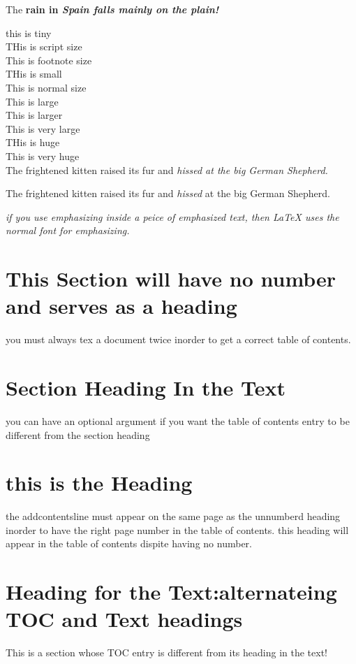 \documentclass[12pt,twoside,leqno]{article}%
\begin{document}
The \bf rain \rm in \it Spain \rm falls \sl mainly \rm on the \sf plain! \rm

\tiny this is tiny\\
\scriptsize THis is script size\\
\footnotesize This is footnote size\\
\small THis is small\\
\normalsize This is normal size\\
\large This is large\\
\Large This is larger\\
\LARGE This is very large\\
\huge THis is huge\\
\Huge This is very huge\normalsize\\


The \tiny frightened kitten \normalsize raised its fur and \it hissed \rm at the \Large big German Shepherd. \normalsize

The {\tiny frightened kitten} raised its fur and {\it hissed} at the {\Large big German Shepherd.}

\emph{if you use emphasizing inside a peice of emphasized text, then \LaTeX{} uses the \emph{normal} font for emphasizing.}
\section*{This Section will have no number and serves as a heading}

you must always tex a document twice inorder to get a correct table of contents.
\section[Entry for the T.O.C.]{Section Heading In the Text}
you can have an optional argument if you want the table of contents entry to be different from the section heading
\section*{this is the Heading}
the addcontentsline must appear on the same page as the unnumberd heading inorder to have the right page number in the table of contents. this heading will appear in the table of contents dispite having no number.

\section[HEading for the TOC]{Heading for the Text:alternateing TOC and Text headings}
This is a section whose TOC entry is different from its heading in the text!
\end{document}
